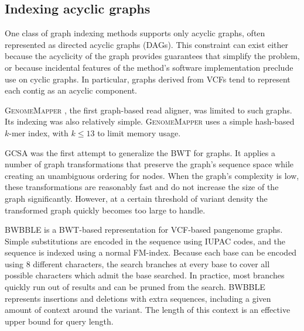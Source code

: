 \subsection{Indexing acyclic graphs}

One class of graph indexing methods supports only acyclic graphs, often represented as directed acyclic graphs (DAGs).
This constraint can exist either because the acyclicity of the graph provides guarantees that simplify the problem, or because incidental features of the method's software implementation preclude use on cyclic graphs.
In particular, graphs derived from VCFs tend to represent each contig as an acyclic component.
 
\textsc{GenomeMapper} \cite{Schneeberger_2009}, the first graph-based read aligner, was limited to such graphs.
Its indexing was also relatively simple.
\textsc{GenomeMapper} uses a simple hash-based $k$-mer index, with $k \le 13$ to limit memory usage.

GCSA \cite{Siren_2014} was the first attempt to generalize the BWT for graphs.
It applies a number of graph transformations that preserve the graph's sequence space while creating an unambiguous ordering for nodes.
When the graph's complexity is low, these transformations are reasonably fast and do not increase the size of the graph significantly.
However, at a certain threshold of variant density the transformed graph quickly becomes too large to handle.

BWBBLE \cite{Huang_2013} is a BWT-based representation for VCF-based pangenome graphs.
Simple substitutions are encoded in the sequence using IUPAC codes, and the sequence is indexed using a normal FM-index.
Because each base can be encoded using 8 different characters, the search branches at every base to cover all possible characters which admit the base searched.
In practice, most branches quickly run out of results and can be pruned from the search.
BWBBLE represents insertions and deletions with extra sequences, including a given amount of context around the variant.
The length of this context is an effective upper bound for query length.

